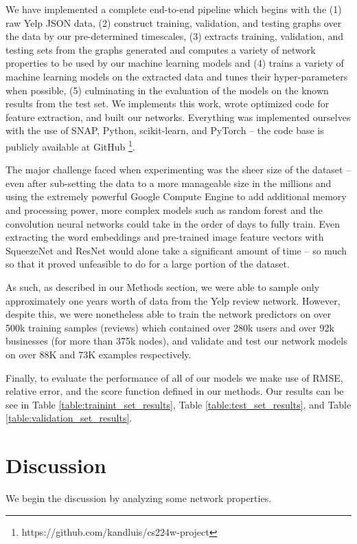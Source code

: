 \documentclass[letterpaper, 10 pt, conference]{ieeeconf}  %
\begin{document}
We have implemented a complete end-to-end pipeline which begins with the (1) raw Yelp JSON data, (2) construct training, validation, and testing graphs over the data by our pre-determined timescales, (3) extracts training, validation, and testing sets from the graphs generated and computes a variety of network properties to be used by our machine learning models and (4) trains a variety of machine learning models on the extracted data and tunes their hyper-parameters when possible, (5) culminating in the evaluation of the models on the known results from the test set. We implements this work, wrote optimized code for feature extraction, and built our networks. Everything was implemented ourselves with the use of SNAP, Python, scikit-learn, and PyTorch -- the code base is publicly available at GitHub \footnote{https://github.com/kandluis/cs224w-project}.

The major challenge faced when experimenting was the sheer size of the dataset -- even after sub-setting the data to a more manageable size in the millions and using the extremely powerful Google Compute Engine to add additional memory and processing power, more complex models such as random forest and the convolution neural networks could take in the order of days to fully train. Even extracting the word embeddings and pre-trained image feature vectors with SqueezeNet and ResNet would alone take a significant amount of time -- so much so that it proved unfeasible to do for a large portion of the dataset.

As such, as described in our Methods section, we were able to sample only approximately one years worth of data from the Yelp review network. However, despite this, we were nonetheless able to train the network predictors on over 500k training samples (reviews) which contained over 280k users and over 92k businesses (for more than 375k nodes), and validate and test our network models on over 88K and 73K examples respectively.

Finally, to evaluate the performance of all of our models we make use of RMSE, relative error, and the score function defined in our methods. Our results can be see in Table \ref{table:trainint_set_results}, Table \ref{table:test_set_results}, and Table \ref{table:validation_set_results}.

\section{Discussion}
We begin the discussion by analyzing some network properties.
\end{document}
